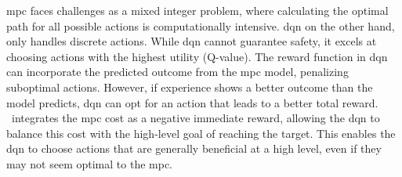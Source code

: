 \gls{mpc} faces challenges as a mixed integer problem, where calculating the optimal path for all possible actions is computationally intensive. \gls{dqn} on the other hand, only handles discrete actions. While \gls{dqn} cannot guarantee safety, it excels at choosing actions with the highest utility (Q-value). 
The reward function in \gls{dqn} can incorporate the predicted outcome from the \gls{mpc} model, penalizing suboptimal actions. However, if experience shows a better outcome than the model predicts, \gls{dqn} can opt for an action that leads to a better total reward. \paperMPC \ integrates the \gls{mpc} cost as a negative immediate reward, allowing the \gls{dqn} to balance this cost with the high-level goal of reaching the target. This enables the \gls{dqn} to choose actions that are generally beneficial at a high level, even if they may not seem optimal to the \gls{mpc}.






